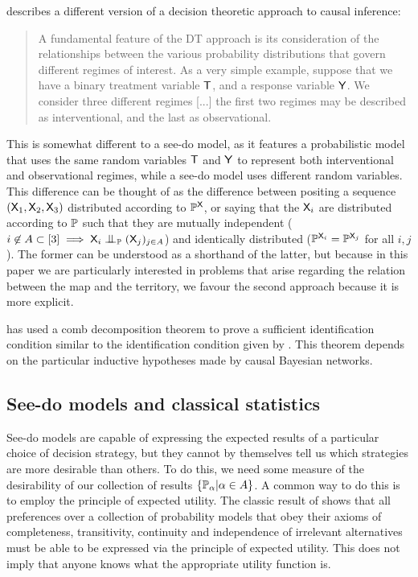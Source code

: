 \citet{dawid_decision-theoretic_2020} describes a different version of a decision theoretic approach to causal inference:

\begin{quote}
A fundamental feature of the DT approach is its consideration of the relationships between the various probability distributions that govern different regimes of interest. As a very simple example, suppose that we have a binary treatment variable $\mathsf{T}$, and a response variable $\mathsf{Y}$. We consider three different regimes [...] the first two regimes may be described as interventional, and the last as observational.
\end{quote}

This is somewhat different to a see-do model, as it features a probabilistic model that uses the same random variables $\mathsf{T}$ and $\mathsf{Y}$ to represent both interventional and observational regimes, while a see-do model uses different random variables. This difference can be thought of as the difference between positing a sequence $(\mathsf{X}_1,\mathsf{X}_2,\mathsf{X}_3)$ distributed according to $\mathbb{P}^{\mathsf{X}}$, or saying that the $\mathsf{X}_i$ are distributed according to $\mathbb{P}$ such that they are mutually independent ($i\not\in A\subset[3]\implies \RV{X}_i\CI_{\prob{P}} (\RV{X}_j)_{j\in A}$) and identically distributed ($\mathbb{P}^{\mathsf{X}_i}=\mathbb{P}^{\mathsf{X}_j}$ for all $i,j$). The former can be understood as a shorthand of the latter, but because in this paper we are particularly interested in problems that arise regarding the relation between the map and the territory, we favour the second approach because it is more explicit.

\citet{jacobs_causal_2019} has used a comb decomposition theorem to prove a sufficient identification condition similar to the identification condition given by \citet{tian2002general}. This theorem depends on the particular inductive hypotheses made by causal Bayesian networks.

\subsection{See-do models and classical statistics}

See-do models are capable of expressing the expected results of a particular choice of decision strategy, but they cannot by themselves tell us which strategies are more desirable than others. To do this, we need some measure of the desirability of our collection of results $\{\mathbb{P}_\alpha|\alpha\in A\}$. A common way to do this is to employ the principle of expected utility. The classic result of \citet{von_neumann_theory_1944} shows that all preferences over a collection of probability models that obey their axioms of completeness, transitivity, continuity and independence of irrelevant alternatives must be able to be expressed via the principle of expected utility. This does not imply that anyone knows what the appropriate utility function is.

